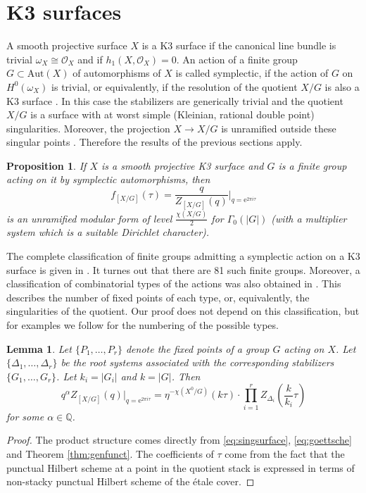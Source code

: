 \documentclass[11pt,a4paper]{amsart}
\newtheorem{lemma}[theorem]{Lemma}
\newtheorem{proposition}[theorem]{Proposition}
\theoremstyle{definition}
\newcommand{\CO}{\mathcal{O}}                    %
\begin{document}
\section{K3 surfaces}
\label{sec:k3surf}

A smooth projective surface $X$ is a K3 surface if the canonical line bundle is trivial $\omega_X \cong \CO_X$ and if $h_1(X,\CO_X)=0$. An action of a finite group $G \subset \mathrm{Aut}(X)$ of automorphisms of $X$ is called symplectic, if the action of $G$ on $H^0(\omega_X)$ is trivial, or equivalently, if the resolution of the quotient $X/G$ is also a K3 surface \cite[Page 1]{xiao1996galois}. In this case the stabilizers are generically trivial and the quotient $X/G$ is a surface with at worst simple (Kleinian, rational double point) singularities. Moreover, the projection $ X \to X/G$ is unramified outside these singular points \cite{mukai1988finite}. Therefore the results of the previous sections apply.

\begin{proposition} 
\label{prop:k3mod}
If $X$ is a smooth projective K3 surface and $G$ is a finite group acting on it by symplectic automorphisms, then
\[f_{[X/G]}(\tau)=\frac{q}{Z_{[X/G]}(q)}\Big|_{q=\mathrm{e}^{2 \pi i \tau}}\]
is an unramified modular form of level $\frac{\chi(X/G)}{2}$ for $\Gamma_0(|G|)$ (with a multiplier system which is a suitable Dirichlet character).
\end{proposition}

The complete classification of finite groups admitting a symplectic action on a K3 surface is given in \cite{mukai1988finite}. It turnes out that there are 81 such finite groups. Moreover, a classification of combinatorial types of the actions was also obtained in \cite{xiao1996galois}. This describes the number of fixed points of each type, or, equivalently, the singularities of the quotient. Our proof does not depend on this classification, but for examples we follow \cite[Table 2]{xiao1996galois} for the numbering of the possible types. 

\begin{lemma}
\label{lem:powerstr}
Let $\{P_1,\dots,P_r\}$ denote the fixed points of a group $G$ acting on $X$. Let $\{ \Delta_1, \dots, \Delta_r \}$ be the  root systems associated with the corresponding stabilizers $\{ G_1,\dots,G_r \}$. Let $k_i=|G_i|$ and $k=|G|$. Then 
\[ q^{\alpha} Z_{[X/G]}(q)\Big|_{q=\mathrm{e}^{2 \pi i \tau}}= \eta^{-\chi(X^0/G)}(k \tau) \cdot \prod_{i=1}^r Z_{\Delta_i}\left(\frac{k}{k_i} \tau\right) \]
for some $\alpha \in \mathbb{Q}$.
\end{lemma}
\begin{proof} The product structure comes directly from \eqref{eq:singsurface}, \eqref{eq:goettsche} and Theorem \ref{thm:genfunct}.
The coefficients of $\tau$ come from the fact that the punctual Hilbert scheme at a point in the quotient stack is expressed in terms of non-stacky punctual Hilbert scheme of the \'etale cover.
\end{proof}
\end{document}

